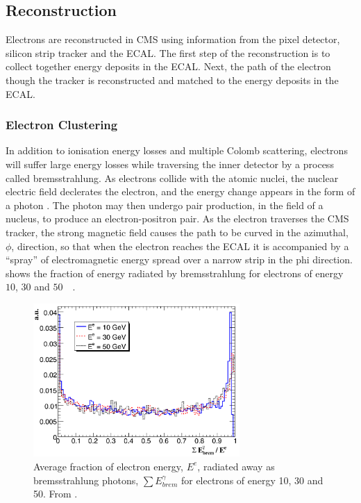 \subsection{Reconstruction}
Electrons are reconstructed in CMS using information from the pixel detector,
silicon strip tracker and the ECAL.  The first step of the reconstruction is to
collect together energy deposits in the ECAL. Next, the path of the electron
though the tracker is reconstructed and matched to the energy deposits in the
ECAL\cite{baffioni2007electron,adam2009electron}.

\subsubsection{Electron Clustering}

In addition to ionisation energy losses and multiple Colomb scattering,
electrons will suffer large energy losses while traversing the inner detector by
a process called bremsstrahlung.  As electrons collide with the atomic nuclei,
the nuclear electric field declerates the electron, and the energy change
appears in the form of a photon \cite{perkins2000introduction}.  The photon may
then undergo pair production, in the field of a nucleus, to produce an
electron-positron pair.  As the electron traverses the CMS tracker, the strong
magnetic field causes the path to be curved in the azimuthal, $\phi$, direction,
so that when the electron reaches the {ECAL} it is accompanied by a ``spray'' of
electromagnetic energy spread over a narrow strip in the phi direction.
 shows the fraction of energy radiated by bremsstrahlung for
electrons of energy $10$, $30$ and \unit{$50$}{\GeV}
\cite{baffioni2007electron}.

\begin{figure}[htbp]
  \centering
  \includegraphics[width=0.7\textwidth]{brem}
  \caption{Average fraction of electron energy, $E^{e}$, radiated away as bremsstrahlung
photons, $\sum E_{brem}^{\gamma}$ for electrons of energy 10, 30 and
\unit{50}{\GeV}. From \cite{baffioni2007electron}. } 
\label{fig:brem}
\end{figure}

